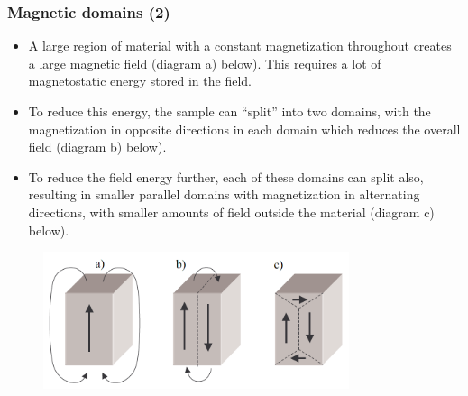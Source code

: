 \begin{frame}
	\frametitle{Magnetic domains (2)}
    \begin{itemize}
        \item A large region of material with a constant magnetization throughout creates a large magnetic field (diagram a) below). This requires a lot of magnetostatic energy stored in the field. 
        \item To reduce this energy, the sample can ``split'' into two domains, with the magnetization in opposite directions in each domain which reduces the overall field (diagram b) below).
        \item  To reduce the field energy further, each of these domains can split also, resulting in smaller parallel domains with magnetization in alternating directions, with smaller amounts of field outside the material (diagram c) below).
    \end{itemize}
\begin{figure}
\begin{columns}
	\begin{column}{0.55\textwidth}
            \centering
            \includegraphics[width=0.8\textwidth]{fig/lec02/Magnetic_domains_energy_min.png}
    \end{column}
\end{columns}
\end{figure}
\end{frame}

